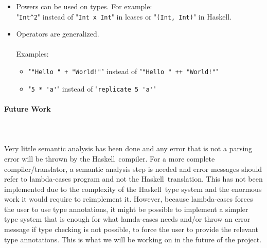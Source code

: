 \documentclass{article}
\def\H{Haskell}
\def\pend{\mbox{}\\\\}
\begin{document}
\begin{itemize}
\begin{itemize}
\item
\begin{verbatim}
(cases, cases)
  (green, green) => true
  (amber, amber) => true
  (red, red) => true
  ... => false
\end{verbatim}
instead of
\begin{verbatim}
\x y -> case (x, y) of
  (Green, Green) => True
  (Amber, Amber) => True
  (Red, Red) => True
  _ => False
\end{verbatim}
\end{itemize}

\item Powers can be used on types.  For example:\\

"\verb|Int^2|" instead of "\verb|Int x Int|" in lcases or "\verb|(Int, Int)|"
in \H. \\

\item Operators are generalized. \\\\
Examples:

\begin{itemize}

\item
"\verb|"Hello " + "World!"|" instead of "\verb|"Hello " ++ "World!"|"

\item
"\verb|5 * 'a'|" instead of "\verb|replicate 5 'a'|"

\end{itemize}


\end{itemize}

\newpage
\paragraph{Future Work}\pend
Very little semantic analysis has been done and any error that is not a
parsing error will be thrown by the \H\ compiler. For a more complete
compiler/translator, a semantic analysis step is needed and error messages
should refer to lambda-cases program and not the \H\ translation. This has not
been implemented due to the complexity of the \H\ type system and the enormous
work it would require to reimplement it. However, because lambda-cases forces
the user to use type annotations, it might be possible to implement a simpler
type system that is enough for what lamda-cases needs and/or throw an error
message if type checking is not possible, to force the user to provide the
relevant type annotations. This is what we will be working on in the future
of the project.

\newpage
\printbibliography
\end{document}
